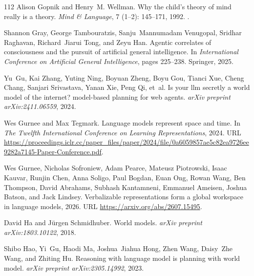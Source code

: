 \begin{thebibliography}{112}
Alison Gopnik and Henry~M. Wellman.
\newblock Why the child's theory of mind really is a theory.
\newblock \emph{Mind \& Language}, 7 (1--2): 145--171, 1992.
\newblock {}.

Shannon Gray, George Tambouratzis, Sanju~Mannumadam Venugopal, Sridhar Raghavan, Richard~Jiarui Tong, and Zeyu Han.
\newblock Agentic correlates of consciousness and the pursuit of artificial general intelligence.
\newblock In \emph{International Conference on Artificial General Intelligence}, pages 225--238. Springer, 2025.

Yu~Gu, Kai Zhang, Yuting Ning, Boyuan Zheng, Boyu Gou, Tianci Xue, Cheng Chang, Sanjari Srivastava, Yanan Xie, Peng Qi, et~al.
\newblock Is your llm secretly a world model of the internet? model-based planning for web agents.
\newblock \emph{arXiv preprint arXiv:2411.06559}, 2024.

Wes Gurnee and Max Tegmark.
\newblock Language models represent space and time.
\newblock In \emph{The Twelfth International Conference on Learning Representations}, 2024.
\newblock URL \url{https://proceedings.iclr.cc/paper_files/paper/2024/file/0a6059857ae5c82ea9726ee9282a7145-Paper-Conference.pdf}.

Wes Gurnee, Nicholas Sofroniew, Adam Pearce, Mateusz Piotrowski, Isaac Kauvar, Runjin Chen, Anna Soligo, Paul Bogdan, Euan Ong, Rowan Wang, Ben Thompson, David Abrahams, Subhash Kantamneni, Emmanuel Ameisen, Joshua Batson, and Jack Lindsey.
\newblock Verbalizable representations form a global workspace in language models, 2026.
\newblock URL \url{https://arxiv.org/abs/2607.15495}.

David Ha and J{\"u}rgen Schmidhuber.
\newblock World models.
\newblock \emph{arXiv preprint arXiv:1803.10122}, 2018.

Shibo Hao, Yi~Gu, Haodi Ma, Joshua~Jiahua Hong, Zhen Wang, Daisy~Zhe Wang, and Zhiting Hu.
\newblock Reasoning with language model is planning with world model.
\newblock \emph{arXiv preprint arXiv:2305.14992}, 2023.


\end{thebibliography}
